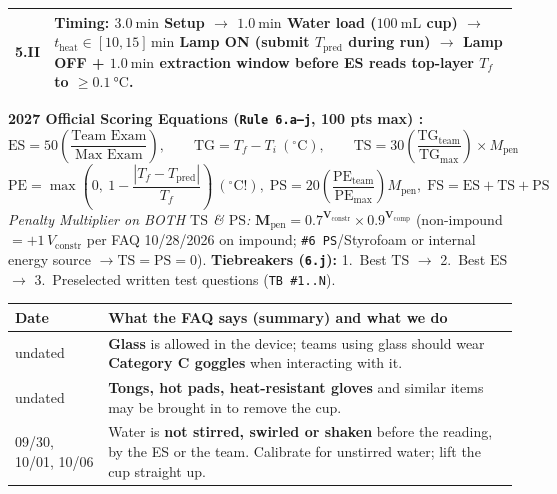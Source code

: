 \documentclass[10pt,twoside,openany,letterpaper]{book}
\begin{document}
\begin{quicksheet}
\begin{twocol}[0.51]
\begin{rulebox}
\begin{tabularx}{\linewidth}{@{}l X@{}}
\textbf{5.II} & \textbf{Timing:} $\SI{3.0}{\minute}$ Setup $\to$ $\SI{1.0}{\minute}$ Water load ($\SI{100}{\milli\liter}$ cup) $\to$ $t_{\mathrm{heat}} \in [10, 15]\,\si{\minute}$ Lamp ON (submit $T_{\mathrm{pred}}$ during run) $\to$ Lamp OFF + $\SI{1.0}{\minute}$ extraction window before ES reads top-layer $T_f$ to $\ge\SI{0.1}{\celsius}$. \\
\bottomrule
\end{tabularx}
\par\smallskip\noindent
\textbf{2027 Official Scoring Equations (\texttt{Rule 6.a--j}, 100 pts max) :}
\[
  \mathrm{ES} = 50\left(\frac{\text{Team Exam}}{\text{Max Exam}}\right), \qquad \mathrm{TG} = T_f - T_i \ (^\circ\mathrm{C}), \qquad \mathrm{TS} = 30\left(\frac{\mathrm{TG}_{\mathrm{team}}}{\mathrm{TG}_{\max}}\right)\times M_{\mathrm{pen}}
\]
\[
  \mathrm{PE} = \max\!\left(0,\ 1 - \frac{|T_f - T_{\mathrm{pred}}|}{T_f}\right)\ (^\circ\mathrm{C}!),\; \mathrm{PS} = 20\!\left(\frac{\mathrm{PE}_{\mathrm{team}}}{\mathrm{PE}_{\max}}\right)M_{\mathrm{pen}},\; \mathbf{\mathrm{FS} = \mathrm{ES} + \mathrm{TS} + \mathrm{PS}}
\]
\emph{Penalty Multiplier on BOTH $\mathrm{TS}$ \& $\mathrm{PS}$:} $\mathbf{M_{\mathrm{pen}} = 0.7^{V_{\mathrm{constr}}} \times 0.9^{V_{\mathrm{comp}}}}$ (non-impound $= +1\,V_{\mathrm{constr}}$ per FAQ 10/28/2026 on impound; \texttt{\#6 PS}/Styrofoam or internal energy source $\to \mathrm{TS}=\mathrm{PS}=0$). \textbf{Tiebreakers (\texttt{6.j}):} 1.~Best $\mathrm{TS}$ $\to$ 2.~Best $\mathrm{ES}$ $\to$ 3.~Preselected written test questions (\texttt{TB~\#1..N}).
\end{rulebox}
\nextcol[0.47]
\begin{formulacard}
\par\smallskip\noindent
\scriptsize\setlength{\tabcolsep}{2.2pt}\renewcommand{\arraystretch}{1.10}
\begin{tabularx}{\linewidth}{@{}l X@{}}
\toprule
\textbf{Date} & \textbf{What the FAQ says (summary) and what we do} \\
\midrule
undated & \textbf{Glass} is allowed in the device; teams using glass should wear \textbf{Category C goggles} when interacting with it. \\
undated & \textbf{Tongs, hot pads, heat-resistant gloves} and similar items may be brought in to remove the cup. \\
09/30, 10/01, 10/06 & Water is \textbf{not stirred, swirled or shaken} before the reading, by the ES or the team. Calibrate for unstirred water; lift the cup straight up. \\

\end{tabularx}
\end{formulacard}
\end{twocol}
\end{quicksheet}
\end{document}
